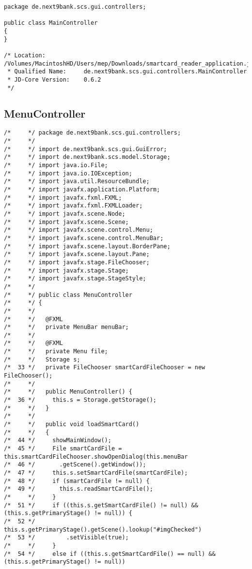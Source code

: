 \begin{lstlisting}
package de.next9bank.scs.gui.controllers;

public class MainController
{
}

/* Location:           /Volumes/MacintoshHD/Users/mep/Downloads/smartcard_reader_application.jar
 * Qualified Name:     de.next9bank.scs.gui.controllers.MainController
 * JD-Core Version:    0.6.2
 */
\end{lstlisting}

\subsection{MenuController}

\begin{lstlisting}
/*     */ package de.next9bank.scs.gui.controllers;
/*     */ 
/*     */ import de.next9bank.scs.gui.GuiError;
/*     */ import de.next9bank.scs.model.Storage;
/*     */ import java.io.File;
/*     */ import java.io.IOException;
/*     */ import java.util.ResourceBundle;
/*     */ import javafx.application.Platform;
/*     */ import javafx.fxml.FXML;
/*     */ import javafx.fxml.FXMLLoader;
/*     */ import javafx.scene.Node;
/*     */ import javafx.scene.Scene;
/*     */ import javafx.scene.control.Menu;
/*     */ import javafx.scene.control.MenuBar;
/*     */ import javafx.scene.layout.BorderPane;
/*     */ import javafx.scene.layout.Pane;
/*     */ import javafx.stage.FileChooser;
/*     */ import javafx.stage.Stage;
/*     */ import javafx.stage.StageStyle;
/*     */ 
/*     */ public class MenuController
/*     */ {
/*     */ 
/*     */   @FXML
/*     */   private MenuBar menuBar;
/*     */ 
/*     */   @FXML
/*     */   private Menu file;
/*     */   Storage s;
/*  33 */   private FileChooser smartCardFileChooser = new FileChooser();
/*     */ 
/*     */   public MenuController() {
/*  36 */     this.s = Storage.getStorage();
/*     */   }
/*     */ 
/*     */   public void loadSmartCard()
/*     */   {
/*  44 */     showMainWindow();
/*  45 */     File smartCardFile = this.smartCardFileChooser.showOpenDialog(this.menuBar
/*  46 */       .getScene().getWindow());
/*  47 */     this.s.setSmartCardFile(smartCardFile);
/*  48 */     if (smartCardFile != null) {
/*  49 */       this.s.readSmartCardFile();
/*     */     }
/*  51 */     if ((this.s.getSmartCardFile() != null) && (this.s.getPrimaryStage() != null)) {
/*  52 */       this.s.getPrimaryStage().getScene().lookup("#imgChecked")
/*  53 */         .setVisible(true);
/*     */     }
/*  54 */     else if ((this.s.getSmartCardFile() == null) && (this.s.getPrimaryStage() != null))

\end{lstlisting}
